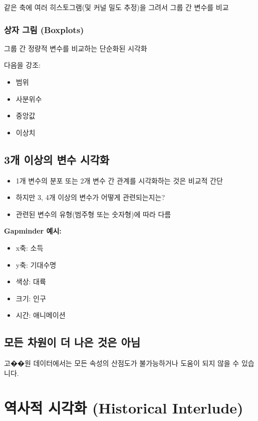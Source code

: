 \documentclass[12pt,a4paper]{article}
\begin{document}
같은 축에 여러 히스토그램(및 커널 밀도 추정)을 그려서 그룹 간 변수를 비교

\subsubsection{상자 그림 (Boxplots)}

그룹 간 정량적 변수를 비교하는 단순화된 시각화

다음을 강조:
\begin{itemize}
    \item 범위
    \item 사분위수
    \item 중앙값
    \item 이상치
\end{itemize}

\subsection{3개 이상의 변수 시각화}

\begin{itemize}
    \item 1개 변수의 분포 또는 2개 변수 간 관계를 시각화하는 것은 비교적 간단
    \item 하지만 3, 4개 이상의 변수가 어떻게 관련되는지는?
    \item 관련된 변수의 유형(범주형 또는 숫자형)에 따라 다름
\end{itemize}

\textbf{Gapminder 예시:}
\begin{itemize}
    \item x축: 소득
    \item y축: 기대수명
    \item 색상: 대륙
    \item 크기: 인구
    \item 시간: 애니메이션
\end{itemize}

\subsection{모든 차원이 더 나은 것은 아님}

고��원 데이터에서는 모든 속성의 산점도가 불가능하거나 도움이 되지 않을 수 있습니다.

\section{역사적 시각화 (Historical Interlude)}
\end{document}
